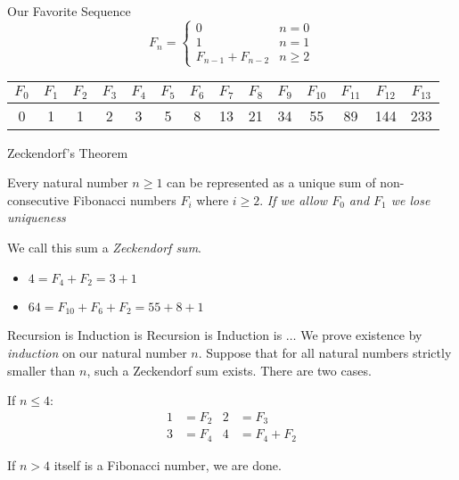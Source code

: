 \documentclass[aspectratio=169]{beamer}
\begin{document}
\begin{frame}{Our Favorite Sequence}
    \[
        F_n = \begin{cases}
                0                       & n = 0 \\
                1                       & n = 1 \\
                F_{n - 1} + F_{n - 2}   & n \geq 2
              \end{cases}
    \]
    
    \pause
    \vspace{20pt}
    \begin{table}[]
        \begin{tabular}{|c|c|c|c|c|c|c|c|c|c|c|c|c|c|}
            \hline
            $F_0$ & $F_1$ & $F_2$ & $F_3$ & $F_4$ & $F_5$ & $F_6$ & $F_7$ & $F_8$ & $F_9$ & $F_{10}$ & $F_{11}$ & $F_{12}$ & $F_{13}$ \\ \hline
            0     & 1     & 1     & 2     & 3     & 5     & 8     & 13    & 21    & 34    & 55       & 89       & 144      & 233      \\ \hline
        \end{tabular}
    \end{table}
\end{frame}

\begin{frame}{Zeckendorf's Theorem}
    \begin{thrm}
        Every natural number $n \geq 1$ can be represented as a unique sum of non-consecutive Fibonacci numbers $F_i$ where $i \geq 2$. \pause
        \textit{If we allow $F_0$ and $F_1$ we lose uniqueness}
        
        We call this sum a \emph{Zeckendorf sum}.
    \end{thrm} \pause
    \begin{itemize}
        \item $4 = F_4 + F_2 = 3 + 1$
        \item $64 = F_{10} + F_6 + F_2 = 55 + 8 + 1$
    \end{itemize}
\end{frame}

\begin{frame}{Recursion is Induction is Recursion is Induction is $\ldots$}
    We prove existence by \emph{induction} on our natural number $n$.
    Suppose that for all natural numbers strictly smaller than $n$, such a Zeckendorf sum exists.
    There are two cases. \pause

    If $n \leq 4\colon$
    \begin{align*}
        1 &= F_2 & 2 &= F_3 \\
        3 &= F_4 & 4 &= F_4 + F_2 
    \end{align*} \pause

    If $n > 4$ itself is a Fibonacci number, we are done.
\end{frame}
\end{document}
